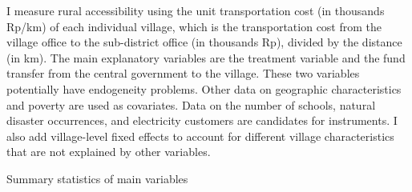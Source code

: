 \documentclass[letterpaper,11pt,leqno]{article}
\newcommand{\bib}{bibliography.bib}
\begin{document}
I measure rural accessibility using the unit transportation cost (in thousands Rp/km) of each individual village, which is the transportation cost from the village office to the sub-district office (in thousands Rp), divided by the distance (in km). The main explanatory variables are the treatment variable and the fund transfer from the central government to the village. These two variables potentially have endogeneity problems.  Other  data on geographic characteristics and poverty are used as covariates. Data on the number of schools, natural disaster occurrences, and electricity customers are candidates for instruments. I also add village-level fixed effects to account for different village characteristics that are not explained by other variables.

\begin{landscape}
\begin{table}[t]
\caption{Summary statistics of main variables}

\label{t1}\end{table}

\end{landscape}
\end{document}
